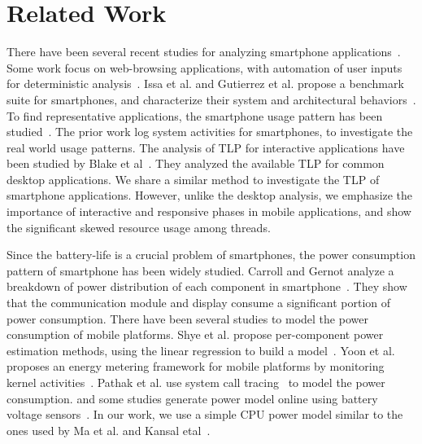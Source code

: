 \chapter{Related Work}

There have been several recent studies for analyzing smartphone applications~\cite{characterinteractive,anatomizing, tmapp, WhySlowBrowser}.
Some work focus on web-browsing applications, with automation of user inputs for deterministic analysis~\cite{anatomizing, WhySlowBrowser}.
Issa et al. and Gutierrez et al. propose a benchmark suite for smartphones,
and characterize their system and architectural behaviors~\cite{characterinteractive, tmapp}. 
To find representative applications, the smartphone usage pattern has been studied~\cite{diversity,intothewild,diversebehavior}.
The prior work log system activities for smartphones, to investigate the real world usage patterns.
The analysis of TLP for interactive applications have been studied by Blake et al~\cite{desktopTLP}. They
analyzed the available TLP for common desktop applications. We share a similar method to
investigate the TLP of smartphone applications. However, unlike the desktop analysis,
we emphasize the importance of interactive and responsive phases in mobile applications,
and show the significant skewed resource usage among threads.

Since the battery-life is a crucial problem of smartphones,
the power consumption pattern of smartphone has been widely studied.
Carroll and Gernot analyze a breakdown of power distribution of each component in smartphone~\cite{smartphonepower}.
They show that the communication module and display consume a significant portion of power consumption.
There have been several studies to model the power consumption of mobile platforms.
Shye et al.  propose per-component power estimation methods, using the linear regression to build a model~\cite{intothewild}.
Yoon et al. proposes an energy metering framework for mobile platforms by monitoring kernel activities~\cite{AppScope}.
Pathak et al. use system call tracing~\cite{powermodelsyscall} to model the power consumption.
and some studies generate power model online using battery voltage sensors~\cite{selfconstructive, accurateonline}. 
In our work, we use a simple CPU power model similar to the ones used by Ma et al. and Kansal etal~\cite{VMpower, isca11DVFS}.

